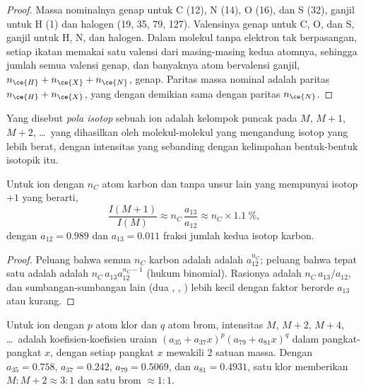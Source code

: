 \begin{proof}
Massa nominalnya genap untuk C (12), N (14), O (16), dan S (32), ganjil
untuk H (1) dan halogen (19,
35, 79, 127). Valensinya genap untuk C, O, dan S, ganjil untuk H, N, dan
halogen. Dalam molekul tanpa elektron tak berpasangan, setiap ikatan
memakai satu valensi dari masing-masing kedua atomnya, sehingga jumlah semua
valensi genap, dan banyaknya atom bervalensi ganjil, $n_{\ce{H}} + n_{\ce{X}} + n_{\ce{N}}$,
genap. Paritas massa nominal adalah paritas $n_{\ce{H}} + n_{\ce{X}}$, yang
dengan demikian sama dengan paritas
$n_{\ce{N}}$.
\end{proof}

\begin{definition}\label{def:b2:mass-spec-atomic:isotope-pattern}
Yang disebut \emph{pola isotop} sebuah ion adalah
kelompok puncak pada $M$, $M+1$,
$M+2$, \dots\ yang dihasilkan oleh molekul-molekul yang mengandung isotop
yang lebih berat, dengan intensitas yang sebanding dengan kelimpahan
bentuk-bentuk isotopik itu.
\end{definition}

\begin{proposition}[Puncak $M+1$]\label{prop:b2:mass-spec-atomic:m-plus-one}
Untuk ion dengan $n_C$ atom karbon dan tanpa unsur lain yang mempunyai isotop $+1$ yang berarti,
\begin{equation*}
\frac{I(M+1)}{I(M)} \approx n_C\,\frac{a_{13}}{a_{12}} \approx n_C \times 1.1~\%,
\end{equation*}
dengan $a_{12} = 0.989$ dan $a_{13} = 0.011$ fraksi jumlah kedua isotop karbon.
\end{proposition}

\begin{proof}
Peluang bahwa semua $n_C$ karbon adalah  adalah $a_{12}^{n_C}$;
peluang bahwa tepat satu adalah
 adalah $n_C\,a_{13}a_{12}^{n_C - 1}$ (hukum binomial). Rasionya
adalah $n_C\,a_{13}/a_{12}$, dan sumbangan-sumbangan lain (dua ,
, ) lebih kecil dengan faktor berorde
$a_{13}$ atau kurang.
\end{proof}

\begin{proposition}\label{prop:b2:mass-spec-atomic:halogen-patterns}
Untuk ion dengan $p$ atom klor dan $q$ atom brom, intensitas $M$, $M+2$, $M+4$, \dots\ adalah
koefisien-koefisien uraian $(a_{35} + a_{37}x)^p(a_{79} + a_{81}x)^q$ dalam
pangkat-pangkat $x$, dengan setiap pangkat $x$ mewakili 2 satuan massa.
Dengan $a_{35} = 0.758$, $a_{37} = 0.242$, $a_{79} = 0.5069$, dan
$a_{81} = 0.4931$, satu klor memberikan $M : M+2 \approx 3 : 1$ dan satu brom $\approx 1 : 1$.
\end{proposition}


